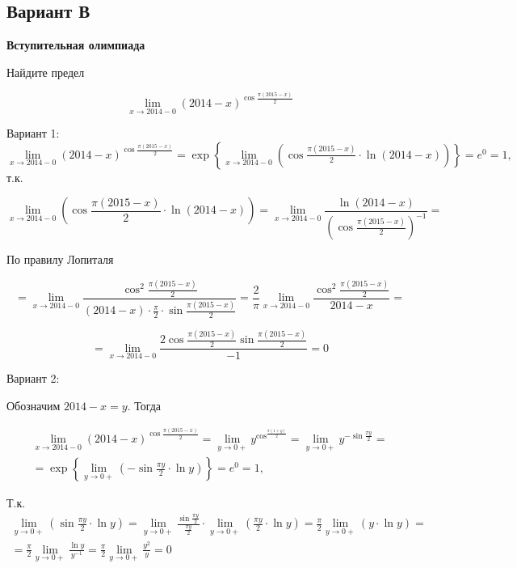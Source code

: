 \documentclass[addpoints, answers]{exam} %
\begin{document}
\subsection{Вариант В}
\textbf{Вступительная олимпиада}

\begin{questions}



\question[10] Найдите предел

\[
\lim_{x\to 2014-0} (2014-x)^{\cos \frac{\pi (2015-x)}{2} }
\]

\begin{solution}
Вариант 1:
$\mathop{\lim }\limits_{x\to 2014-0} (2014-x)^{\cos \frac{\pi (2015-x)}{2} } =\exp \left\{\mathop{\lim }\limits_{x\to 2014-0} \left(\cos \frac{\pi (2015-x)}{2} \cdot \ln (2014-x)\right)\right\}=e^{0} =1,$ т.к.

\[\mathop{\lim }\limits_{x\to 2014-0} \left(\cos \frac{\pi (2015-x)}{2} \cdot \ln (2014-x)\right)=\mathop{\lim }\limits_{x\to 2014-0} \frac{\ln (2014-x)}{\left(\cos \frac{\pi (2015-x)}{2} \right)^{-1} } =\]

По правилу Лопиталя

\[=\mathop{\lim }\limits_{x\to 2014-0} \frac{\cos ^{2} \frac{\pi (2015-x)}{2} }{(2014-x)\cdot \frac{\pi }{2} \cdot \sin \frac{\pi (2015-x)}{2} } =\frac{2}{\pi } \mathop{\lim }\limits_{x\to 2014-0} \frac{\cos ^{2} \frac{\pi (2015-x)}{2} }{2014-x} =\]

\[=\mathop{\lim }\limits_{x\to 2014-0} \frac{2\cos \frac{\pi (2015-x)}{2} \sin \frac{\pi (2015-x)}{2} }{-1} =0\]


Вариант 2:

Обозначим $2014-x=y$. Тогда

\[\begin{array}{l} {\mathop{\lim }\limits_{x\to 2014-0} (2014-x)^{\cos \frac{\pi (2015-x)}{2} } =\mathop{\lim }\limits_{y\to 0+} y^{\cos ^{\frac{\pi (1+y)}{2} } } =\mathop{\lim }\limits_{y\to 0+} y^{-\sin \frac{\pi y}{2} } =} \\ {=\exp \left\{\mathop{\lim }\limits_{y\to 0+} \left(-\sin \frac{\pi y}{2} \cdot \ln y\right)\right\}=e^{0} =1,} \end{array}\]

Т.к. $\begin{array}{l} {\mathop{\lim }\limits_{y\to 0+} \left(\sin \frac{\pi y}{2} \cdot \ln y\right)=\mathop{\lim }\limits_{y\to 0+} \frac{\sin \frac{\pi y}{2} }{\frac{\pi y}{2} } \cdot \mathop{\lim }\limits_{y\to 0+} \left(\frac{\pi y}{2} \cdot \ln y\right)=\frac{\pi }{2} \mathop{\lim }\limits_{y\to 0+} \left(y\cdot \ln y\right)=} \\ {=\frac{\pi }{2} \mathop{\lim }\limits_{y\to 0+} \frac{\ln y}{y^{-1} } =\frac{\pi }{2} \mathop{\lim }\limits_{y\to 0+} \frac{y^{2} }{y} =0} \end{array}$


\end{solution}
\end{questions}
\end{document}
